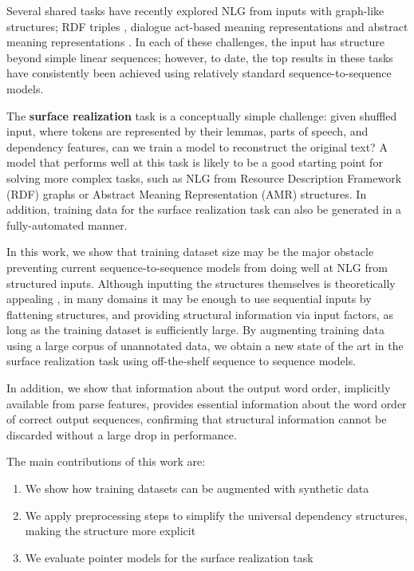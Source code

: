\documentclass[11pt,a4paper]{article}
\begin{document}
Several shared tasks have recently explored NLG from inputs with graph-like structures; RDF triples \citep{Colin2016TheData}, dialogue act-based meaning representations \citep{Novikova2017TheGeneration} and abstract meaning representations \citep{May2017}. In each of these challenges, the input has structure beyond simple linear sequences; however, to date, the top results in these tasks have consistently been achieved using relatively standard sequence-to-sequence models. 

The \textbf{surface realization} task is a conceptually simple challenge: given shuffled input, where tokens are represented by their lemmas, parts of speech, and dependency features, can we train a model to reconstruct the original text? A model that performs well at this task is likely to be a good starting point for solving more complex tasks, such as NLG from Resource Description Framework (RDF) graphs or Abstract Meaning Representation (AMR) structures. In addition, training data for the surface realization task can also be generated in a fully-automated manner.

In this work, we show that training dataset size may be the major obstacle preventing current sequence-to-sequence models from doing well at NLG from structured inputs. Although inputting the structures themselves is theoretically appealing \cite{Tai2015ImprovedNetworks}, in many domains it may be enough to use sequential inputs by flattening structures, and providing structural information via input factors, as long as the training dataset is sufficiently large. By augmenting training data using a large corpus of unannotated data, we obtain a new state of the art in the surface realization task using off-the-shelf sequence to sequence models. 

In addition, we show that information about the output word order, implicitly available from parse features, provides essential information about the word order of correct output sequences, confirming that structural information cannot be discarded without a large drop in performance.

The main contributions of this work are:

\begin{enumerate}
  \item We show how training datasets can be augmented with synthetic data
  \item We apply preprocessing steps to simplify the universal dependency structures, making the structure more explicit
  \item We evaluate pointer models for the surface realization task 
\end{enumerate}
\end{document}
